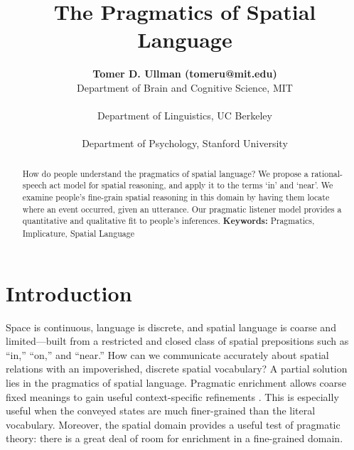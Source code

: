 \documentclass[10pt,letterpaper]{article}
\title{The Pragmatics of Spatial Language}
\author{
{\large \bf Tomer D. Ullman (tomeru@mit.edu)} \\
  Department of Brain and Cognitive Science, MIT\\
  \And{\large \bf Yang Xu (yang\_xu\_ch@berkeley.edu)} \\
  Department of Linguistics, UC Berkeley \\
 \AND{\large \bf Noah D. Goodman (ngoodman@stanford.edu)} \\
  Department of Psychology, Stanford University\\
}
\newcommand{\ndg}[1]{\textcolor{Green}{[ndg: #1]}}
\begin{document}
\maketitle

\begin{abstract}

How do people understand the pragmatics of spatial language? 
We propose a rational-speech act model for spatial reasoning, and apply it to the terms `in' and `near'. We examine people's fine-grain spatial reasoning in this domain by having them locate where an event occurred, given an utterance. Our pragmatic listener model provides a quantitative and qualitative fit to people's inferences. \textbf{Keywords:}
Pragmatics, Implicature, Spatial Language

\end{abstract}

\section{Introduction} 
Space is continuous, language is discrete, and spatial language is coarse and limited---built from a restricted and closed class of spatial prepositions \cite{talmy83,talmy00,landau93} such as ``in,'' ``on,'' and ``near.'' 
How can we communicate accurately about spatial relations with an impoverished, discrete spatial vocabulary?
A partial solution lies in the pragmatics of spatial language.
Pragmatic enrichment allows coarse fixed meanings to gain useful context-specific refinements \cite{grice75,horn84}.
This is especially useful when the conveyed states are much finer-grained than the literal vocabulary. Moreover, the spatial domain provides a useful test of pragmatic theory: there is a great deal of room for enrichment in a fine-grained domain.

%
\end{document}
